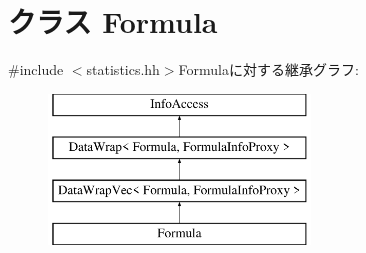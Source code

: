 \hypertarget{classStats_1_1Formula}{
\section{クラス Formula}
\label{classStats_1_1Formula}
}


{\ttfamily \#include $<$statistics.hh$>$}Formulaに対する継承グラフ:\begin{figure}[H]
\begin{center}
\leavevmode
\includegraphics[height=4cm]{classStats_1_1Formula}
\end{center}
\end{figure}
